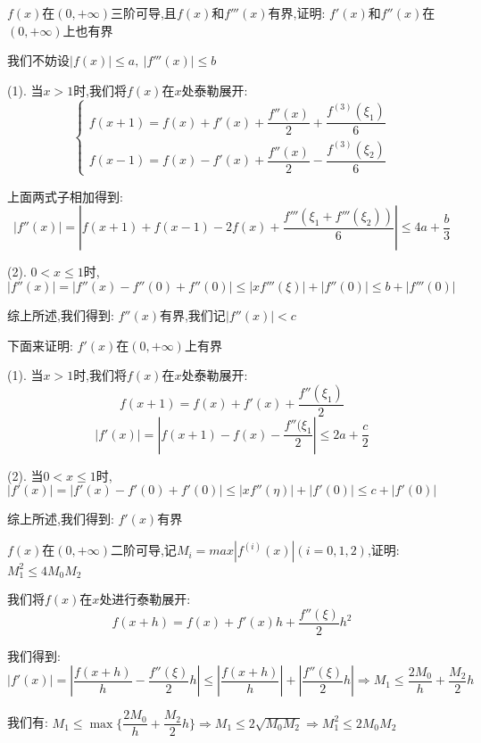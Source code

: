 
\begin{proposition}
	$f(x)$在$(0,+\infty)$三阶可导,且$f(x)$和$f'''(x)$有界,证明: $f'(x)$和$f''(x)$在$(0,+\infty)$上也有界
\end{proposition}
\begin{solution}

	我们不妨设$|f(x)|\leq a,\ |f'''(x)|\leq b$

	(1). 当$x>1$时,我们将$f(x)$在$x$处泰勒展开:
	$$\left\lbrace
		\begin{array}{l}
			f(x+1)=f(x)+f'(x)+\dfrac{f''(x)}{2}+\dfrac{f^{(3)}(\xi_{1})}{6} \\
			f(x-1)=f(x)-f'(x)+\dfrac{f''(x)}{2}-\dfrac{f^{(3)}(\xi_{2})}{6}
		\end{array}
		\right. $$

	上面两式子相加得到:
	$$|f''(x)|=|f(x+1)+f(x-1)-2f(x)+\dfrac{f'''(\xi_{1}+f'''(\xi_{2}))}{6}|\leq 4a+\dfrac{b}{3}$$

	(2). $0<x\leq 1$时,$|f''(x)|=|f''(x)-f''(0)+f''(0)|\leq |xf'''(\xi)|+|f''(0)|\leq b+|f'''(0)|$

	综上所述,我们得到: $f''(x)$有界,我们记$|f''(x)|<c$

	下面来证明: $f'(x)$在$(0,+\infty)$上有界

	(1). 当$x>1$时,我们将$f(x)$在$x$处泰勒展开:
	$$f(x+1)=f(x)+f'(x)+\dfrac{f''(\xi_{1})}{2}$$
	$$|f'(x)|=|f(x+1)-f(x)-\dfrac{f''(\xi_{1}}{2}|\leq 2a+\dfrac{c}{2}$$

	(2). 当$0<x\leq 1$时,$|f'(x)|=|f'(x)-f'(0)+f'(0)|\leq |xf''(\eta)|+|f'(0)|\leq c+|f'(0)|$

	综上所述,我们得到: $f'(x)$有界
\end{solution}


\begin{proposition}
	$f(x)$在$(0,+\infty)$二阶可导,记$M_{i}=max|f^{(i)}(x)|(i=0,1,2)$,证明: $M_{1}^2\leq 4M_{0}M_{2}$
\end{proposition}
\begin{solution}

	我们将$f(x)$在$x$处进行泰勒展开:
	$$f(x+h)=f(x)+f'(x)h+\dfrac{f''(\xi)}{2}h^2$$

	我们得到:
	$$|f'(x)|=|\dfrac{f(x+h)}{h}-\dfrac{f''(\xi)}{2}h|\leq |\dfrac{f(x+h)}{h}|+|\dfrac{f''(\xi)}{2}h|\Rightarrow M_{1}\leq \dfrac{2M_{0}}{h}+\dfrac{M_{2}}{2}h$$

	我们有: $M_{1}\leq \max\{\dfrac{2M_{0}}{h}+\dfrac{M_{2}}{2}h\}\Rightarrow M_{1}\leq 2\sqrt{M_{0}M_{2}}\Rightarrow M_{1}^2\leq 2M_{0}M_{2}$
\end{solution}

